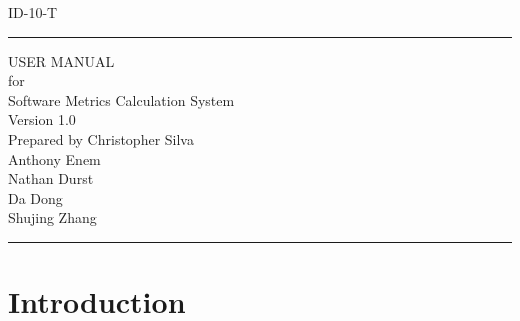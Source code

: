 \documentclass{scrreprt}
\author{Christopher Silva}
\date{}
\def\myversion{1.0 }
\begin{document}
	\begin{titlepage}
		\flushright
		\LARGE{ID-10-T}
		\rule{16cm}{5pt}\vskip1cm
		\Huge{USER MANUAL}\\
		\vspace{2cm}
		for\\
		\vspace{2cm}
		Software Metrics Calculation System\\
		\vspace{2cm}
		\LARGE{Version \myversion\\}
		\vspace{2cm}
		Prepared by Christopher Silva\\
		Anthony Enem\\
		Nathan Durst\\
		Da Dong\\
		Shujing Zhang\\
		\vfill
		\rule{16cm}{5pt}
	\end{titlepage}
	\tableofcontents	
	\chapter{Introduction}
	
\end{document}
